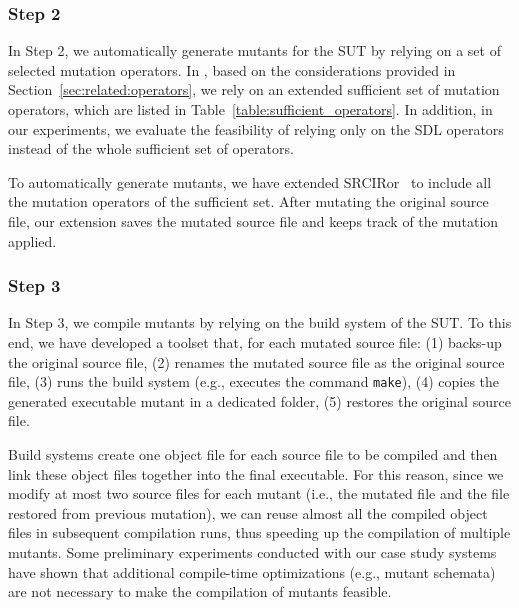 \subsubsection{Step 2}

In Step 2, we automatically generate mutants for the SUT by relying on a set of selected mutation operators.
In \APPR, based on the considerations provided in Section~\ref{sec:related:operators}, we rely on an extended sufficient set of mutation operators, which are listed in Table~\ref{table:sufficient_operators}.
In addition, in our experiments, we evaluate the feasibility of relying only on the SDL operators instead of the whole sufficient set of operators.



To automatically generate mutants, we have extended SRCIRor~\cite{hariri2018srciror} to include all the mutation operators of the sufficient set. After mutating the original source file, our extension saves the mutated source file and keeps track of the mutation applied. 

\subsubsection{Step 3}
\label{codeDriven:stepThree}

In Step 3, we compile mutants by relying on the build system of the SUT. To this end, we have developed a toolset that, for each mutated source file: (1) backs-up the original source file, (2) renames the mutated source file as the original source file, (3) runs the build system (e.g., executes the command \texttt{make}), (4) copies the generated executable mutant in a dedicated folder, (5) restores the original source file. 

Build systems create one object file for each source file to be compiled and then link these object files together into the final executable. For this reason, since we modify at most two source files for each mutant (i.e., the mutated file and the file restored from previous mutation), we can reuse almost all the compiled object files in subsequent compilation runs, thus speeding up the compilation of multiple mutants. Some preliminary experiments conducted with our case study systems have shown that additional compile-time optimizations (e.g., mutant schemata) are not necessary to make the compilation of mutants feasible.


